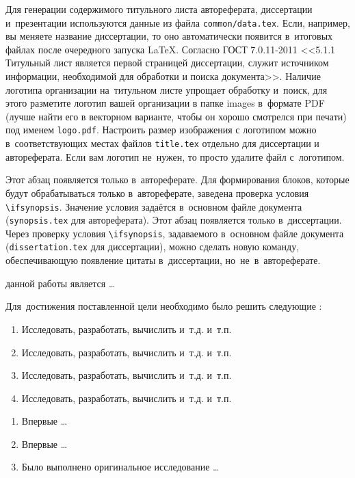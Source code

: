 Для генерации содержимого титульного листа автореферата, диссертации
и~презентации используются данные из файла \verb!common/data.tex!. Если,
например, вы меняете название диссертации, то оно автоматически
появится в~итоговых файлах после очередного запуска \LaTeX. Согласно
ГОСТ 7.0.11-2011 <<5.1.1 Титульный лист является первой страницей
диссертации, служит источником информации, необходимой для обработки и
поиска документа>>. Наличие логотипа организации на~титульном листе
упрощает обработку и~поиск, для этого разметите логотип вашей
организации в папке images в~формате PDF (лучше найти его в векторном
варианте, чтобы он хорошо смотрелся при печати) под именем
\verb!logo.pdf!. Настроить размер изображения с логотипом можно
в~соответствующих местах файлов \verb!title.tex!  отдельно для
диссертации и автореферата. Если вам логотип не~нужен, то просто
удалите файл с~логотипом.

\ifsynopsis
  Этот абзац появляется только в~автореферате.
  Для формирования блоков, которые будут обрабатываться только в~автореферате,
  заведена проверка условия \verb!\!\verb!ifsynopsis!.
  Значение условия задаётся в~основном файле документа (\verb!synopsis.tex! для
  автореферата).
\else
  Этот абзац появляется только в~диссертации.
  Через проверку условия \verb!\!\verb!ifsynopsis!, задаваемого в~основном файле
  документа (\verb!dissertation.tex! для диссертации), можно сделать новую
  команду, обеспечивающую появление цитаты в~диссертации, но~не~в~автореферате.
\fi


{\aim} данной работы является \ldots

Для~достижения поставленной цели необходимо было решить следующие {\tasks}:
\begin{enumerate}
  \item Исследовать, разработать, вычислить и~т.\:д. и~т.\:п.
  \item Исследовать, разработать, вычислить и~т.\:д. и~т.\:п.
  \item Исследовать, разработать, вычислить и~т.\:д. и~т.\:п.
  \item Исследовать, разработать, вычислить и~т.\:д. и~т.\:п.
\end{enumerate}


{\novelty}
\begin{enumerate}
  \item Впервые \ldots
  \item Впервые \ldots
  \item Было выполнено оригинальное исследование \ldots
\end{enumerate}

